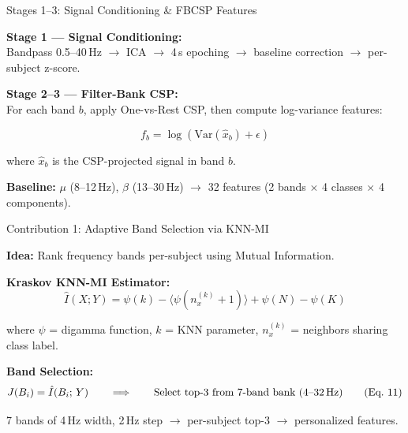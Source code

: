 \documentclass[10pt]{beamer}
\begin{document}
\begin{frame}{Stages 1--3: Signal Conditioning \& FBCSP Features}

\footnotesize
\textbf{Stage 1 --- Signal Conditioning:}\\
Bandpass 0.5--40\,Hz $\to$ ICA $\to$ 4\,s epoching $\to$ baseline correction $\to$ per-subject z-score.

\vspace{2pt}
\textbf{Stage 2--3 --- Filter-Bank CSP:}\\
For each band $b$, apply One-vs-Rest CSP, then compute log-variance features:

\vspace{-2pt}
\begin{equation}
\boxed{f_b = \log\!\left(\mathrm{Var}(\hat{x}_b) + \epsilon\right)}
\tag{Eq.~7}
\end{equation}

\vspace{-4pt}
where $\hat{x}_b$ is the CSP-projected signal in band $b$.

\vspace{2pt}
\textbf{Baseline:} $\mu$ (8--12\,Hz), $\beta$ (13--30\,Hz) $\to$ 32 features (2 bands $\times$ 4 classes $\times$ 4 components).

\end{frame}

\begin{frame}{Contribution 1: Adaptive Band Selection via KNN-MI}

\footnotesize
\textbf{Idea:} Rank frequency bands per-subject using Mutual Information.

\vspace{2pt}
\textbf{Kraskov KNN-MI Estimator:}
\vspace{-2pt}
\begin{equation}
\hat{I}(X; Y) = \psi(k) - \langle \psi(n_x^{(k)} + 1) \rangle + \psi(N) - \psi(K)
\tag{Eq.~8}
\end{equation}

\vspace{-4pt}
where $\psi$ = digamma function, $k$ = KNN parameter, $n_x^{(k)}$ = neighbors sharing class label.

\vspace{2pt}
\textbf{Band Selection:}
\vspace{-2pt}
\begin{equation}
J(B_i) = \hat{I}(B_i;\, Y) \qquad \Longrightarrow \qquad \text{Select top-3 from 7-band bank (4--32\,Hz)}
\tag{Eq.~11}
\end{equation}

\vspace{-2pt}
7 bands of 4\,Hz width, 2\,Hz step $\to$ per-subject top-3 $\to$ personalized features.

\end{frame}
\end{document}
